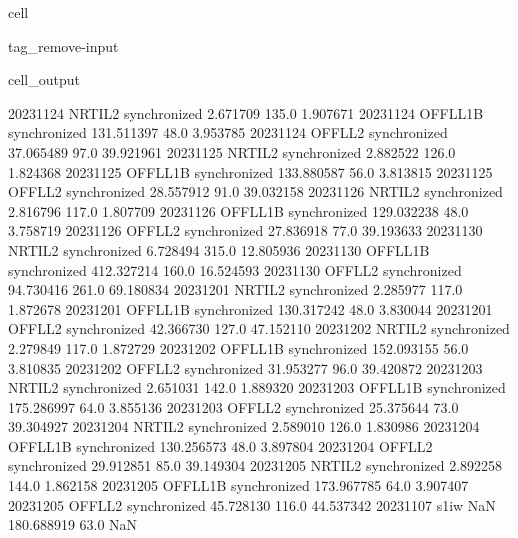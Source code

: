 \documentclass[letterpaper,10pt,english]{jupyterBook}
\begin{document}
\begin{sphinxuseclass}{cell}
\begin{sphinxuseclass}{tag_remove-input}
\begin{sphinxVerbatimOutput}
\begin{sphinxuseclass}{cell_output}
\begin{sphinxVerbatim}[commandchars=\\\{\}]
2023\PYGZhy{}11\PYGZhy{}24      NRTI\PYGZus{}L2  synchronized    2.671709   135.0    1.907671
2023\PYGZhy{}11\PYGZhy{}24     OFFL\PYGZus{}L1B  synchronized  131.511397    48.0    3.953785
2023\PYGZhy{}11\PYGZhy{}24      OFFL\PYGZus{}L2  synchronized   37.065489    97.0   39.921961
2023\PYGZhy{}11\PYGZhy{}25      NRTI\PYGZus{}L2  synchronized    2.882522   126.0    1.824368
2023\PYGZhy{}11\PYGZhy{}25     OFFL\PYGZus{}L1B  synchronized  133.880587    56.0    3.813815
2023\PYGZhy{}11\PYGZhy{}25      OFFL\PYGZus{}L2  synchronized   28.557912    91.0   39.032158
2023\PYGZhy{}11\PYGZhy{}26      NRTI\PYGZus{}L2  synchronized    2.816796   117.0    1.807709
2023\PYGZhy{}11\PYGZhy{}26     OFFL\PYGZus{}L1B  synchronized  129.032238    48.0    3.758719
2023\PYGZhy{}11\PYGZhy{}26      OFFL\PYGZus{}L2  synchronized   27.836918    77.0   39.193633
2023\PYGZhy{}11\PYGZhy{}30      NRTI\PYGZus{}L2  synchronized    6.728494   315.0   12.805936
2023\PYGZhy{}11\PYGZhy{}30     OFFL\PYGZus{}L1B  synchronized  412.327214   160.0   16.524593
2023\PYGZhy{}11\PYGZhy{}30      OFFL\PYGZus{}L2  synchronized   94.730416   261.0   69.180834
2023\PYGZhy{}12\PYGZhy{}01      NRTI\PYGZus{}L2  synchronized    2.285977   117.0    1.872678
2023\PYGZhy{}12\PYGZhy{}01     OFFL\PYGZus{}L1B  synchronized  130.317242    48.0    3.830044
2023\PYGZhy{}12\PYGZhy{}01      OFFL\PYGZus{}L2  synchronized   42.366730   127.0   47.152110
2023\PYGZhy{}12\PYGZhy{}02      NRTI\PYGZus{}L2  synchronized    2.279849   117.0    1.872729
2023\PYGZhy{}12\PYGZhy{}02     OFFL\PYGZus{}L1B  synchronized  152.093155    56.0    3.810835
2023\PYGZhy{}12\PYGZhy{}02      OFFL\PYGZus{}L2  synchronized   31.953277    96.0   39.420872
2023\PYGZhy{}12\PYGZhy{}03      NRTI\PYGZus{}L2  synchronized    2.651031   142.0    1.889320
2023\PYGZhy{}12\PYGZhy{}03     OFFL\PYGZus{}L1B  synchronized  175.286997    64.0    3.855136
2023\PYGZhy{}12\PYGZhy{}03      OFFL\PYGZus{}L2  synchronized   25.375644    73.0   39.304927
2023\PYGZhy{}12\PYGZhy{}04      NRTI\PYGZus{}L2  synchronized    2.589010   126.0    1.830986
2023\PYGZhy{}12\PYGZhy{}04     OFFL\PYGZus{}L1B  synchronized  130.256573    48.0    3.897804
2023\PYGZhy{}12\PYGZhy{}04      OFFL\PYGZus{}L2  synchronized   29.912851    85.0   39.149304
2023\PYGZhy{}12\PYGZhy{}05      NRTI\PYGZus{}L2  synchronized    2.892258   144.0    1.862158
2023\PYGZhy{}12\PYGZhy{}05     OFFL\PYGZus{}L1B  synchronized  173.967785    64.0    3.907407
2023\PYGZhy{}12\PYGZhy{}05      OFFL\PYGZus{}L2  synchronized   45.728130   116.0   44.537342
2023\PYGZhy{}11\PYGZhy{}07        s1\PYGZus{}iw           NaN  180.688919    63.0         NaN

\end{sphinxVerbatim}
\end{sphinxuseclass}
\end{sphinxVerbatimOutput}
\end{sphinxuseclass}
\end{sphinxuseclass}
\end{document}
